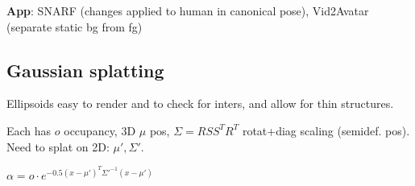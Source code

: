 \textbf{App}: SNARF (changes applied to human in canonical pose), Vid2Avatar (separate static bg from fg)

\subsection*{Gaussian splatting}

Ellipsoids easy to render and to check for inters, and allow for thin structures.

Each has $o$ occupancy, 3D $\mu$ pos, $\Sigma = RS S^T R^T$ rotat+diag scaling (semidef. pos). Need to splat on 2D: $\mu', \Sigma'$.

$\alpha = o \cdot e^{-0.5(x-\mu')^T \Sigma'^{-1}(x-\mu')}$